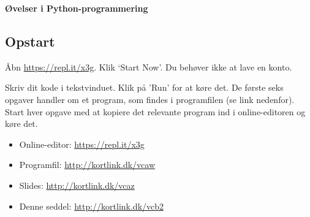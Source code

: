\documentclass[12pt]{article}
\begin{document}
\centerline{\LARGE\bf Øvelser i Python-programmering}

\subsection*{Opstart}

Åbn \url{https://repl.it/x3g}. Klik `Start Now'. Du behøver ikke at lave en konto.


Skriv dit kode i tekstvinduet. Klik på 'Run' for at køre det.
De første seks opgaver handler om et program, som findes i
programfilen (se link nedenfor). Start hver opgave med at kopiere det relevante program ind i
online-editoren og køre det.

\begin{itemize}
\item Online-editor: \url{https://repl.it/x3g}
\item Programfil: \url{http://kortlink.dk/vcaw}
\item Slides: \url{http://kortlink.dk/vcaz}
\item Denne seddel: \url{http://kortlink.dk/vcb2}
\end{itemize}
\end{document}
